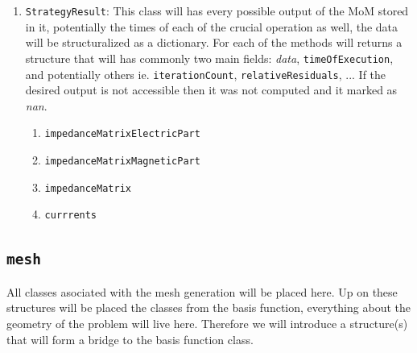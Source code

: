 \documentclass[9pt]{article}
\begin{document}
\begin{enumerate}[label=\Roman*.]
        \begin{enumerate}[label=\roman*.]
            \item \texttt{constructor}: This will be parameteric constructor. Three level constructor aproach.
            \item \texttt{setTarget}: Parameteric, but for the first time i would make it such that one target is required.
            \item \texttt{target}: Returns the target name.
            \item \texttt{setMemoryMiB}: Give the MoM maximal amout of the memory for the computation in MiB. Other units will be considered.
            \item \texttt{memoryMiB}: Returns the given memory in MiB.
            \item \texttt{setMemoryGiB}
            \item \texttt{memoryGiB}
        \end{enumerate}
        \item \texttt{StrategyResult}: This class will has every possible output of the MoM stored in it, potentially the times of each of the crucial operation as well, the data will be structuralized as a dictionary. For each of the methods will returns a structure that will has commonly two main fields: \textit{data}, \texttt{timeOfExecution}, and potentially others ie. \texttt{iterationCount}, \texttt{relativeResiduals}, ... If the desired output is not accessible then it was not computed and it marked as \textit{nan}.
        \begin{enumerate}[label=\roman*.]
            \item \texttt{impedanceMatrixElectricPart}
            \item \texttt{impedanceMatrixMagneticPart}
            \item \texttt{impedanceMatrix}
            \item \texttt{currrents}
        \end{enumerate}
    \end{enumerate}

    \subsection{\texttt{mesh}}

    All classes asociated with the mesh generation will be placed here. Up on these structures will be placed the classes from the basis function, everything about the geometry of the problem will live here. Therefore we will introduce a structure(s) that will form a bridge to the basis function class.
\end{document}
